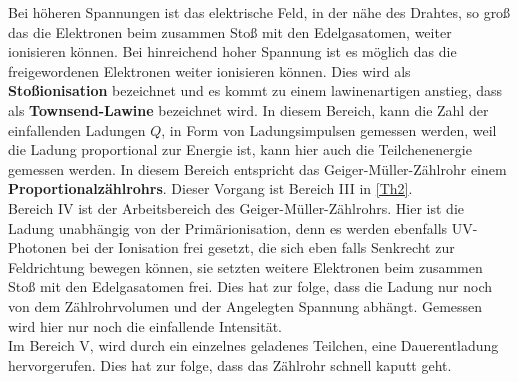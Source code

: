Bei höheren Spannungen ist das elektrische Feld, in der nähe des Drahtes, so groß das die Elektronen beim zusammen Stoß mit den Edelgasatomen, weiter ionisieren können. Bei hinreichend hoher Spannung ist es möglich das die freigewordenen Elektronen weiter ionisieren können. Dies wird als \textbf{Stoßionisation} bezeichnet und es kommt zu einem lawinenartigen anstieg, dass als \textbf{Townsend-Lawine} bezeichnet wird. In diesem Bereich, kann die Zahl der einfallenden Ladungen $Q$, in Form von Ladungsimpulsen gemessen werden, weil die Ladung proportional zur Energie ist, kann hier auch die Teilchenenergie gemessen werden. In diesem Bereich entspricht das Geiger-Müller-Zählrohr einem \textbf{Proportionalzählrohrs}. Dieser Vorgang ist Bereich III in \cref{Th2}.\\
Bereich IV ist der Arbeitsbereich des Geiger-Müller-Zählrohrs. Hier ist die Ladung unabhängig von der Primärionisation, denn es werden ebenfalls UV-Photonen bei der Ionisation frei gesetzt, die sich eben falls Senkrecht zur Feldrichtung bewegen können, sie setzten weitere Elektronen beim zusammen Stoß mit den Edelgasatomen frei. Dies hat zur folge, dass die Ladung nur noch von dem Zählrohrvolumen und der Angelegten Spannung abhängt. Gemessen wird hier nur noch die einfallende Intensität.\\
Im Bereich V, wird durch ein einzelnes geladenes Teilchen, eine Dauerentladung hervorgerufen. Dies hat zur folge, dass das Zählrohr schnell kaputt geht.
